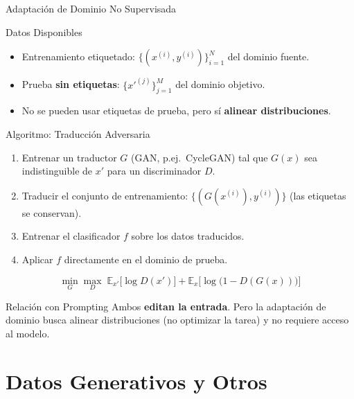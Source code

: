 \documentclass[aspectratio=169, 10pt]{beamer}
\providecommand{\E}{\mathbb{E}}
\newcommand{\formula}[1]{%
	\begin{tcolorbox}[colback=UCMBlue!8, colframe=UCMBlue, arc=4pt,
		boxsep=2pt, left=6pt, right=6pt, top=3pt, bottom=3pt]
		#1
	\end{tcolorbox}
}
\begin{document}
\begin{frame}[shrink]{Adaptaci\'on de Dominio No Supervisada}

	\begin{block}{Datos Disponibles}
		\begin{itemize}
			\item Entrenamiento etiquetado: $\{(x^{(i)}, y^{(i)})\}_{i=1}^{N}$ del dominio fuente.
			\item Prueba \textbf{sin etiquetas}: $\{x'^{(j)}\}_{j=1}^{M}$ del dominio objetivo.
			\item No se pueden usar etiquetas de prueba, pero s\'i \textbf{alinear distribuciones}.
		\end{itemize}
	\end{block}

	\vspace{0.2cm}

	\begin{block}{Algoritmo: Traducci\'on Adversaria}
		\begin{enumerate}
			\item Entrenar un traductor $G$ (GAN, p.ej.\ CycleGAN) tal que $G(x)$ sea indistinguible de $x'$ para un discriminador $D$.
			\item Traducir el conjunto de entrenamiento: $\{(G(x^{(i)}), y^{(i)})\}$ (las etiquetas se conservan).
			\item Entrenar el clasificador $f$ sobre los datos traducidos.
			\item Aplicar $f$ directamente en el dominio de prueba.
		\end{enumerate}
	\end{block}

	\formula{
		\[
		\min_G \max_D \; \E_{x'}\big[\log D(x')\big] + \E_{x}\big[\log\big(1 - D(G(x))\big)\big]
		\]
	}

	\begin{alertblock}{Relaci\'on con Prompting}
		Ambos \textbf{editan la entrada}. Pero la adaptaci\'on de dominio busca alinear distribuciones (no optimizar la tarea) y no requiere acceso al modelo.
	\end{alertblock}

\end{frame}

\section{Datos Generativos y Otros}
\end{document}
